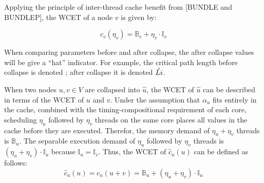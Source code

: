 Applying the principle of inter-thread cache benefit from \addcite{}
[BUNDLE and BUNDLEP], the WCET of a node ${v}$ is given by:

\begin{equation}
  c_v(\eta_v) = \mathbb{B}_v + \eta_v \cdot \mathbb{I}_v
\end{equation}

When comparing parameters before and after collapse, the after
collapse values will be give a ``hat'' indicator. For example, the
critical path length before collapse is denoted
; after collapse it is denoted
${\hat{L{i}}}$.

When two nodes ${u,v \in V}$ are collapsed into ${\hat{u}}$, the WCET
of ${\hat{u}}$ can be described in terms of the WCET of ${u}$ and
${v}$. Under the assumption that ${\alpha_u}$ fits entirely in the
cache, combined with the timing-compositional 
requirement of each core, scheduling ${\eta_u}$ followed by ${\eta_v}$
threads on the same core places all values in the cache before they
are executed. Therefor, the memory demand of ${\eta_u + \eta_v}$
threads is ${\mathbb{B}_u}$. The separable execution demand of
${\eta_u}$ followed by ${\eta_v}$ threads is ${(\eta_u + \eta_v) \cdot
  \mathbb{I}_u}$ because ${\mathbb{I}_u = \mathbb{I}_v}$. Thus, the
WCET of ${\hat{c}_u(u)}$ can be defined as  
follows:
\begin{equation*}
  \hat{c}_u(u) = c_u(u + v) = \mathbb{B}_u + (\eta_u + \eta_v) \cdot
      \mathbb{I}_u 
\end{equation*}

